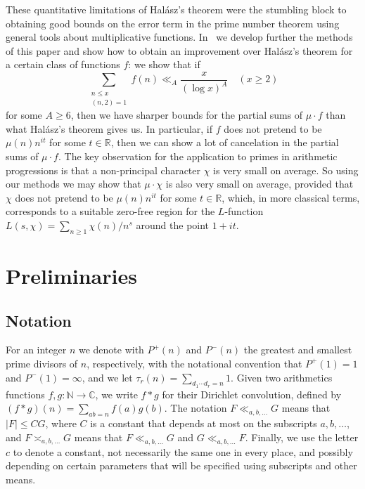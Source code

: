\documentclass[12pt]{amsart}
\theoremstyle{remark}
\newcommand {\SN} {{\mathbb N}}
\newcommand {\SR} {{\mathbb R}}
\newcommand {\SC} {{\mathbb C}}
\numberwithin{equation}{section}
\begin{document}
These quantitative limitations of Hal\'asz's theorem were the stumbling block to obtaining good bounds on the error term in the prime number theorem using general tools about multiplicative functions. In~\cite{kou} we develop further the methods of this paper and show how to obtain an improvement over Hal\'asz's theorem for a certain class of functions $f$: we show that if
$$
\sum_{\substack{n\le x \\ (n,2)=1}} f(n)\ll_A\frac x{(\log x)^A}\quad(x\ge2)
$$
for some $A\ge6$, then we have sharper bounds for the partial sums of $\mu\cdot f$ than what Hal\'asz's theorem gives us. In particular, if $f$ does not pretend to be $\mu(n)n^{it}$ for some $t\in\SR$, then we can show a lot of cancelation in the partial sums of $\mu\cdot f$. The key observation for the application to primes in arithmetic progressions is that a non-principal character $\chi$ is very small on average. So using our methods we may show that $\mu\cdot\chi$ is also very small on average, provided that $\chi$ does not pretend to be $\mu(n)n^{it}$ for some $t\in\SR$, which, in more classical terms, corresponds to a suitable zero-free region for the $L$-function $L(s,\chi)=\sum_{n\ge1}\chi(n)/n^s$ around the point $1+it$.


\section{Preliminaries}

\subsection*{Notation} For an integer $n$ we denote with $P^+(n)$ and $P^-(n)$ the greatest and smallest prime divisors of $n$, respectively, with the notational convention that $P^+(1)=1$ and $P^-(1)=\infty$, and we let $\tau_r(n)=\sum_{d_1\cdots d_r=n}1$. Given two arithmetics functions $f,g:\SN\to\SC$, we write $f*g$ for their Dirichlet convolution, defined by $(f*g)(n)=\sum_{ab=n}f(a)g(b)$. The notation $F\ll_{a,b,\dots}G$ means that $|F|\le CG$, where $C$ is a constant that depends at most on the subscripts $a,b,\dots$, and $F\asymp_{a,b,\dots} G$ means that $F\ll_{a,b,\dots}G$ and $G\ll_{a,b,\dots}F$. Finally, we use the letter $c$ to denote a constant, not necessarily the same one in every place, and possibly depending on certain parameters that will be specified using subscripts and other means.
\end{document}
